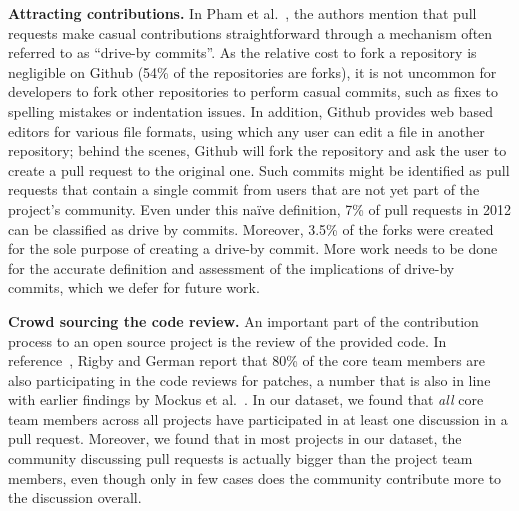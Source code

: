 \documentclass{acm_proc_article-sp}
\begin{document}
\textbf{Attracting contributions.}
In Pham et al.~\cite{Pham13}, the authors mention
that pull requests make casual contributions straightforward through
a mechanism often referred to as ``drive-by commits''. As the
relative cost to fork a repository is negligible on Github (54\% of the
repositories are forks), it is not uncommon for developers to fork other
repositories to perform casual commits, such as fixes to spelling mistakes or
indentation issues. In addition, Github provides web based editors
for various file formats, using which any user can edit a file in another
repository; behind the scenes, Github will fork the repository and ask the user
to create a pull request to the original one. Such commits might be identified
as pull requests that contain a single commit from users that are not yet part
of the project's community. Even under this na\"ive definition, 7\% of pull
requests in 2012 can be classified as drive by commits. Moreover, 3.5\% of the
forks were created for the sole purpose of creating a drive-by commit. More
work needs to be done for the accurate definition and assessment of the
implications of drive-by commits, which we defer for future work.

\textbf{Crowd sourcing the code review.}
An important part of the contribution process to an open source project is the
review of the provided code. In reference~\cite{Rigby06}, Rigby and German
report that 80\% of the core team members are also participating in the code
reviews for patches, a number that is also in line with earlier findings by
Mockus et al.~\cite{MOCKU02}. In our dataset, we found that \emph{all} core
team members across all projects have participated in at least
one discussion in a pull request. Moreover, we found that in most projects
in our dataset, the community discussing pull requests is actually bigger
than the project team members, even though only in few cases does the community
contribute more to the discussion overall.

\end{document}
